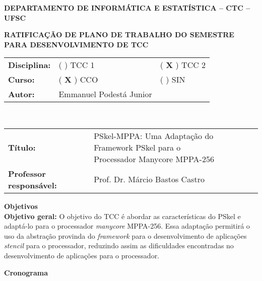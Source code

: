 \documentclass[12pt]{article}
\begin{document}
\pagestyle{empty}

\begin{centering}

    \textbf{DEPARTAMENTO DE INFORMÁTICA E ESTATÍSTICA -- CTC -- UFSC}

    \textbf{RATIFICAÇÃO DE PLANO DE TRABALHO DO SEMESTRE \\ PARA DESENVOLVIMENTO DE TCC}

\end{centering}


\vspace{1em}
\setlength\extrarowheight{5pt}
\begin{tabular}{l l l}
    \textbf{Disciplina:} & ( ) TCC 1  &  ( \textbf{X} ) TCC 2\\
    \textbf{Curso:}      & ( \textbf{X} ) CCO & ( ) SIN \\
    \textbf{Autor:}      & Emmanuel Podestá Junior &\\
\end{tabular}
\vspace{0.5cm}
\\
\begin{tabular}{l l}
\vspace{0.5cm}
     \textbf{Título:} & \makecell{PSkel-MPPA: Uma Adaptação do Framework PSkel para o \\Processador Manycore MPPA-256}\\
    \textbf{Professor responsável:} & Prof. Dr. Márcio Bastos Castro\\
\end{tabular}


\vspace{1em}
{\large \textbf{Objetivos}}
\\

\textbf{Objetivo geral:}
O objetivo do TCC é abordar as características do PSkel e adaptá-lo para o processador \textit{manycore} MPPA-256. Essa adaptação permitirá o uso da abstração provinda do \textit{framework} para o desenvolvimento de aplicações \textit{stencil} para o processador, reduzindo assim as dificuldades encontradas no desenvolvimento de aplicações para o processador.

\vspace{1em}
{\large \textbf{Cronograma}}

\end{document}
